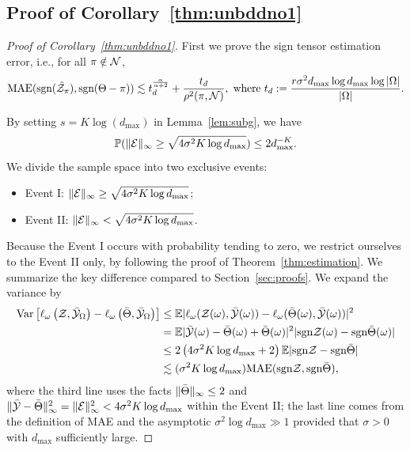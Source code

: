 \documentclass[twoside,11pt]{article}
\theoremstyle{definition}
\def\sign{\textup{sgn}}
\begin{document}
\subsection{Proof of Corollary~\ref{thm:unbddno1}}
\begin{proof}[Proof of Corollary~\ref{thm:unbddno1}]
First we prove the sign tensor estimation error, i.e., for all $\pi \notin\mathcal{N}$, 
\begin{align}\label{eq:corosign}
 \textup{MAE}(\textup{sgn}(\hat {\mathcal{Z}}_\pi),\textup{sgn}(\Theta-\pi))\lesssim t_d^{\alpha\over \alpha+2}+\frac{t_d}{\rho^2(\pi,\mathcal{N})}, \text{ where } t_d :={ r\sigma^2d_{\max}\log d_{\max}\log |\Omega|\over |\Omega|}.
\end{align} 


By setting $s=K\log(d_{\max})$ in Lemma~\ref{lem:subg}, we have
\[
\mathbb{P}(\lVert\mathcal{E}\rVert_\infty\geq \sqrt{4\sigma^2K\log d_{\max}} )\leq 2d_{\max}^{-K}.
\]
We divide the sample space into two exclusive events:
\begin{itemize}
\item Event I: $\lVert\mathcal{E}\rVert_\infty\geq \sqrt{4\sigma^2K\log d_{\max}}$;
\item Event II: $\lVert\mathcal{E}\rVert_\infty< \sqrt{4\sigma^2K\log d_{\max}}$.
\end{itemize}
Because the Event I occurs with probability tending to zero, we restrict ourselves to the Event II only, by following the proof of Theorem~\ref{thm:estimation}. We summarize the key difference compared to Section~\ref{sec:proofs}. 
We expand the variance by 
\begin{align}
    \label{eq:variance2}
    \text{Var}\left[\ell_\omega\left(\tZ,\bar\tY_\Omega\right)-\ell_\omega\left(\bar\Theta,\bar\tY_\Omega\right)\right]&\leq \mathbb{E}|\ell_\omega(\tZ(\omega),\bar\tY(\omega))-\ell_\omega(\bar\Theta(\omega),\bar\tY(\omega))|^2\notag \\
    &= \mathbb{E}|\bar \tY(\omega)-\bar \Theta(\omega)+\bar\Theta(\omega)|^2|\text{sgn}\tZ(\omega)-\text{sgn}\bar\Theta(\omega)| \notag \\
    &\leq 2\left(4 \sigma^2K\log d_{\max}+2\right) \mathbb{E}|\text{sgn}\tZ-\text{sgn}\bar\Theta| \notag \\
    & \lesssim (\sigma^2K \log d_{\max}) \text{MAE}(\sign \tZ, \sign \bar \Theta),
    \end{align}
where the third line uses the facts $\lVert\bar \Theta\rVert_\infty\leq 2$ and $\lVert\bar {\mathcal{Y}}-\bar \Theta\rVert_\infty^2=\lVert\mathcal{E}\rVert_\infty^2<4 \sigma^2K\log d_{\max}$ within the Event II; the last line comes from the definition of MAE and the asymptotic $\sigma^2\log d_{\max}\gg 1$ provided that $\sigma>0$ with $d_{\max}$ sufficiently large. 


\end{proof}
\end{document}
